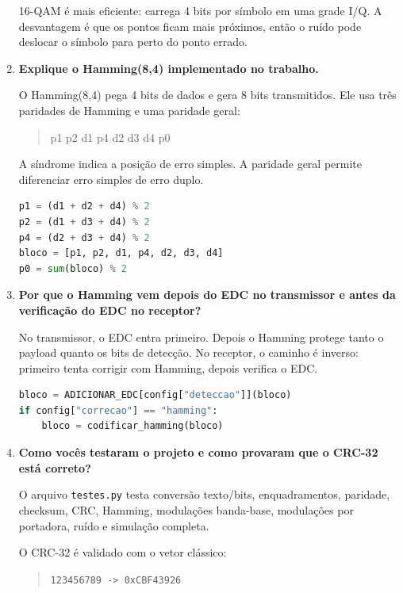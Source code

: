 \documentclass[11pt,a4paper]{article}
\newcommand{\rank}[1]{\textcolor{rankblue}{\textbf{Rank #1}}}
\begin{document}
\begin{enumerate}[leftmargin=1.2cm, itemsep=8pt]
  16-QAM é mais eficiente: carrega 4 bits por símbolo em uma grade I/Q. A desvantagem é que os pontos ficam mais próximos, então o ruído pode deslocar o símbolo para perto do ponto errado.

  \item[\rank{8}.] \textbf{Explique o Hamming(8,4) implementado no trabalho.}

  O Hamming(8,4) pega 4 bits de dados e gera 8 bits transmitidos. Ele usa três paridades de Hamming e uma paridade geral:

  \begin{quote}
  p1 p2 d1 p4 d2 d3 d4 p0
  \end{quote}

  A síndrome indica a posição de erro simples. A paridade geral permite diferenciar erro simples de erro duplo.

  \begin{lstlisting}[language=Python]
p1 = (d1 + d2 + d4) % 2
p2 = (d1 + d3 + d4) % 2
p4 = (d2 + d3 + d4) % 2
bloco = [p1, p2, d1, p4, d2, d3, d4]
p0 = sum(bloco) % 2
  \end{lstlisting}

  \item[\rank{9}.] \textbf{Por que o Hamming vem depois do EDC no transmissor e antes da verificação do EDC no receptor?}

  No transmissor, o EDC entra primeiro. Depois o Hamming protege tanto o payload quanto os bits de detecção. No receptor, o caminho é inverso: primeiro tenta corrigir com Hamming, depois verifica o EDC.

  \begin{lstlisting}[language=Python]
bloco = ADICIONAR_EDC[config["deteccao"]](bloco)
if config["correcao"] == "hamming":
    bloco = codificar_hamming(bloco)
  \end{lstlisting}

  \item[\rank{10}.] \textbf{Como vocês testaram o projeto e como provaram que o CRC-32 está correto?}

  O arquivo \texttt{testes.py} testa conversão texto/bits, enquadramentos, paridade, checksum, CRC, Hamming, modulações banda-base, modulações por portadora, ruído e simulação completa.

  O CRC-32 é validado com o vetor clássico:

  \begin{quote}
  \texttt{123456789 -> 0xCBF43926}
  \end{quote}


\end{enumerate}
\end{document}
